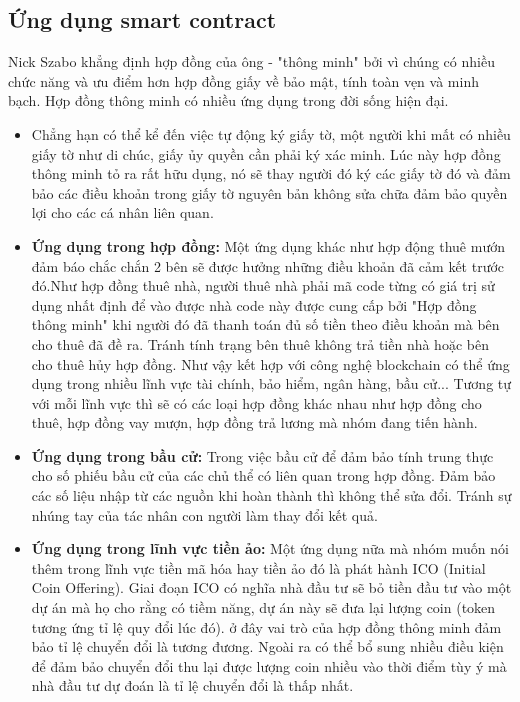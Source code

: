 \documentclass[12pt,a4paper,oneside]{article}
\begin{document}
\subsection{Ứng dụng smart contract}

Nick Szabo khẳng định hợp đồng của ông - "thông minh" bởi vì chúng có nhiều chức năng và ưu điểm hơn hợp đồng giấy về bảo mật, tính toàn vẹn và minh bạch. Hợp đồng thông minh có nhiều ứng dụng trong đời sống hiện đại.
\begin{itemize}
	\item Chẳng hạn có thể kể đến việc tự động ký giấy tờ, một người khi mất có nhiều giấy tờ như di chúc, giấy ủy quyền cần phải ký xác minh. Lúc này hợp đồng thông minh tỏ ra rất hữu dụng, nó sẽ thay người đó ký các giấy tờ đó và đảm bảo các điều khoản trong giấy tờ nguyên bản không sửa chữa đảm bảo quyền lợi cho các cá nhân liên quan.
	\item \textbf{Ứng dụng trong hợp đồng:} Một ứng dụng khác như hợp động thuê mướn đảm báo chắc chắn 2 bên sẽ được hưởng những điều khoản đã cảm kết trước đó.Như hợp đồng thuê nhà, người thuê nhà phải mã code từng có giá trị sử dụng nhất định để vào được nhà  code này được cung cấp bởi "Hợp đồng thông minh" khi người đó đã thanh toán đủ số tiền theo điều khoản mà bên cho thuê đã đề ra. Tránh tính trạng bên thuê không trả tiền nhà hoặc bên cho thuê hủy hợp đồng. Như vậy kết hợp với công nghệ blockchain có thể ứng dụng trong nhiều lĩnh vực tài chính, bảo hiểm, ngân hàng, bầu cử... Tương tự với mỗi lĩnh vực thì sẽ có các loại hợp đồng khác nhau như hợp đồng cho thuê, hợp đồng vay mượn, hợp đồng trả lương mà nhóm đang tiến hành.
	\item \textbf{Ứng dụng trong bầu cử: }Trong việc bầu cử để đảm bảo tính trung thực cho số phiếu bầu cử của các chủ thể có liên quan trong hợp đồng. Đảm bảo các số liệu nhập từ các nguồn khi hoàn thành thì không thể sửa đổi. Tránh sự nhúng tay của tác nhân con người làm thay đổi kết quả.
	\item \textbf{Ứng dụng trong lĩnh vực tiền ảo: }Một ứng dụng nữa mà nhóm muốn nói thêm trong lĩnh vực tiền mã hóa hay tiền ảo đó là phát hành ICO (Initial Coin Offering). Giai đoạn ICO có nghĩa nhà đầu tư sẽ bỏ tiền đầu tư vào một dự án mà họ cho rằng có tiềm năng, dự án này sẽ đưa lại lượng coin (token tương ứng tỉ lệ quy đổi lúc đó). ở đây vai trò của hợp đồng thông minh đảm bảo tỉ lệ chuyển đổi là tương đương. Ngoài ra có thể bổ sung nhiều điều kiện để đảm  bảo chuyển đổi thu lại được lượng coin nhiều vào thời điểm tùy ý mà nhà đầu tư dự đoán là tỉ lệ chuyển đổi là thấp nhất.
\end{itemize}
\end{document}
